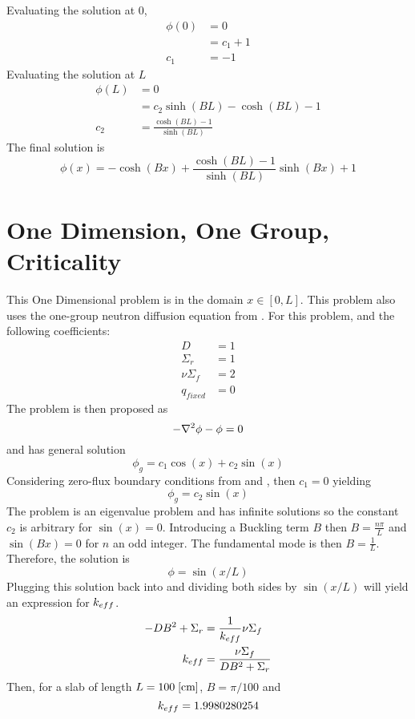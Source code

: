   Evaluating the solution at 0, 
  \begin{align}
    \phi(0) &= 0 \\
    &= c_1 + 1\\
    c_1 &= -1
  \end{align}
  Evaluating the solution at $L$
  \begin{align}
    \phi(L) &= 0\\
    &= c_2 \sinh(BL) - \cosh(BL)-1\\
    c_2 &= \frac{\cosh(BL)-1}{\sinh(BL)}
  \end{align}
  The final solution is 
  \begin{equation} \label{eq:one_dimension}
    \phi(x) = -\cosh(Bx) + \frac{\cosh(BL)-1}{\sinh(BL)} \sinh(Bx) +1
  \end{equation}
  
\section{One Dimension, One Group, Criticality} 
  \label{sec:onegroup1d}
  This One Dimensional problem is in the domain $x \in [0,L]$.
  This problem also uses the one-group neutron diffusion equation from 
  . For this problem, and the following coefficients:
  \begin{align*}
    D &= 1\\
    \Sigma_r &= 1\\
    \nu \Sigma_f &= 2\\
    q_{fixed} &= 0
  \end{align*}
  The problem is then proposed as 
  \begin{equation}
    -\mathbf{\nabla}^2 \phi - \phi = 0 
  \end{equation}
  and has general solution
  \begin{equation} \label{eq:critical_general}
    \phi_g = c_1 \cos(x) + c_2 \sin(x)
  \end{equation}
  Considering zero-flux boundary conditions from  and 
  , then $c_1 = 0 $ yielding
  \begin{equation} \label{eq:sinshape}
    \phi_g = c_2 \sin(x)
  \end{equation}
  The problem is an eigenvalue problem and has infinite solutions so the 
  constant $c_2$ is arbitrary for $\sin(x)=0$. Introducing a Buckling term $B$
  then $B=\frac{n \pi}{L}$ and $\sin(Bx)=0$ for $n$ an odd integer. The 
  fundamental mode is then $B=\frac{1}{L}$. Therefore, the solution is 
  \begin{equation} \label{eq:onedimensionsol}
    \phi = \sin(x/L)
  \end{equation}
  Plugging this solution back into  and dividing both sides
  by $\sin(x/L)$ will yield an expression for $k_{eff}$.
  \begin{align}
    -D B^2 + \Sigma_r &= \frac{1}{k_{eff}} \nu \Sigma_f \\
    k_{eff} &= \frac{\nu \Sigma_f}{DB^2 + \Sigma_r} \label{eq:keff1d}
  \end{align}
  Then, for a slab of length $ L = 100 \;\text{[{cm}]} $, $B = \pi / 100$ and
  \begin{equation}
    k_{eff} = 1.9980280254
  \end{equation}
